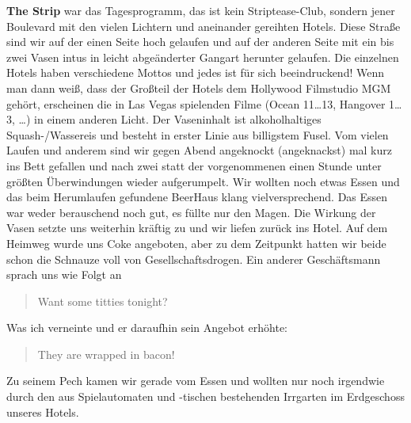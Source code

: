 \textbf{The Strip} war das Tagesprogramm, das ist kein Striptease-Club, sondern jener Boulevard mit den vielen Lichtern und aneinander gereihten Hotels.
Diese Straße sind wir auf der einen Seite hoch gelaufen und auf der anderen Seite mit ein bis zwei Vasen intus in leicht abgeänderter Gangart herunter gelaufen.
Die einzelnen Hotels haben verschiedene Mottos und jedes ist für sich beeindruckend!
Wenn man dann weiß, dass der Großteil der Hotels dem Hollywood Filmstudio MGM gehört, erscheinen die in Las Vegas spielenden Filme (Ocean 11\dots 13, Hangover 1\dots 3, \dots) in einem anderen Licht.
Der Vaseninhalt ist alkoholhaltiges Squash-/Wassereis und besteht in erster Linie aus billigstem Fusel.
Vom vielen Laufen und anderem sind wir gegen Abend angeknockt (angeknackst) mal kurz ins Bett gefallen und nach zwei statt der vorgenommenen einen Stunde unter größten Überwindungen wieder aufgerumpelt.
Wir wollten noch etwas Essen und das beim Herumlaufen gefundene BeerHaus klang vielversprechend.
Das Essen war weder berauschend noch gut, es füllte nur den Magen.
Die Wirkung der Vasen setzte uns weiterhin kräftig zu und wir liefen zurück ins Hotel.
Auf dem Heimweg wurde uns Coke angeboten, aber zu dem Zeitpunkt hatten wir beide schon die Schnauze voll von Gesellschaftsdrogen.
Ein anderer Geschäftsmann sprach uns wie Folgt an
\begin{quote}
	Want some titties tonight?
\end{quote}
Was ich verneinte und er daraufhin sein Angebot erhöhte:
\begin{quote}
	They are wrapped in bacon!
\end{quote}
Zu seinem Pech kamen wir gerade vom Essen und wollten nur noch irgendwie durch den aus Spielautomaten und -tischen bestehenden Irrgarten im Erdgeschoss unseres Hotels.
